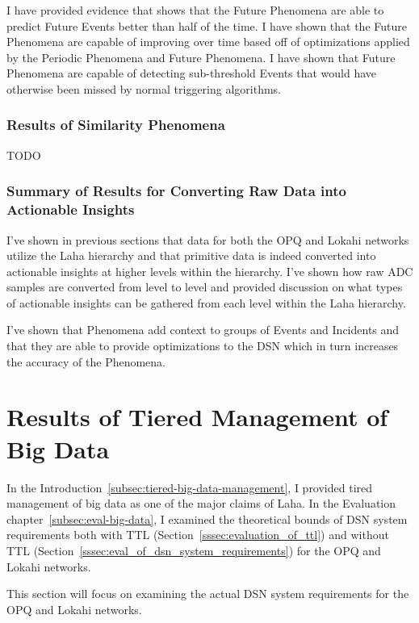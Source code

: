 I have provided evidence that shows that the Future Phenomena are able to predict Future Events better than half of the time. I have shown that the Future Phenomena are capable of improving over time based off of optimizations applied by the Periodic Phenomena and Future Phenomena. I have shown that Future Phenomena are capable of detecting sub-threshold Events that would have otherwise been missed by normal triggering algorithms.

\subsubsection{Results of Similarity Phenomena}

TODO

\subsubsection{Summary of Results for Converting Raw Data into Actionable Insights}

I've shown in previous sections that data for both the OPQ and Lokahi networks utilize the Laha hierarchy and that primitive data is indeed converted into actionable insights at higher levels within the hierarchy. I've shown how raw ADC samples are converted from level to level and provided discussion on what types of actionable insights can be gathered from each level within the Laha hierarchy.

I've shown that Phenomena add context to groups of Events and Incidents and that they are able to provide optimizations to the DSN which in turn increases the accuracy of the Phenomena.

\section{Results of Tiered Management of Big Data}\label{sec:dsn-system-requirements}

In the Introduction~\ref{subsec:tiered-big-data-management}, I provided tired management of big data as one of the major claims of Laha. In the Evaluation chapter~\ref{subsec:eval-big-data}, I examined the theoretical bounds of DSN system requirements both with TTL (Section~\ref{sssec:evaluation_of_ttl}) and without TTL (Section~\ref{sssec:eval_of_dsn_system_requirements}) for the OPQ and Lokahi networks.

This section will focus on examining the actual DSN system requirements for the OPQ and Lokahi networks.

